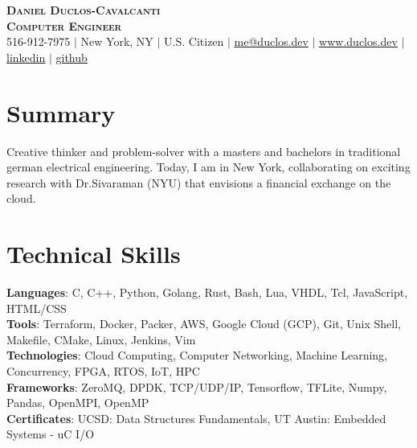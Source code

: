 \documentclass[letterpaper,11pt]{article}
\begin{document}
\begin{flushright}
\end{flushright}

\vspace{-5pt}

\begin{center}
    \textbf{\Huge \scshape Daniel Duclos-Cavalcanti} \\ \vspace{1pt}
    \textbf{\large{\scshape Computer Engineer}} \\ \vspace{1pt}
    \small 516-912-7975 $|$ New York, NY $|$ U.S. Citizen $|$
    \href{mailto:me@duclos.dev}{\underline{me@duclos.dev}} $|$ 
    \href{https://www.duclos.dev}{\underline{www.duclos.dev}} $|$
    \href{https://www.linkedin.com/in/duclos-cavalcanti/}{\underline{linkedin}} $|$
    \href{https://github.com/duclos-cavalcanti}{\underline{github}}
\end{center}

\section{Summary}
\small{
Creative thinker and problem-solver with a masters and bachelors in 
traditional german electrical engineering. Today, I am in New York, 
collaborating on exciting research with Dr.Sivaraman (NYU) that 
envisions a financial exchange on the cloud.
}

\vspace{-8.0pt}

\section{Technical Skills}
 \begin{itemize}[leftmargin=0.15in, label={}]
    \small{\item{
    \textbf{Languages}{: C, C++, Python, Golang, Rust, Bash, Lua, VHDL, Tcl, JavaScript, HTML/CSS} \\
    \textbf{Tools}{: Terraform, Docker, Packer, AWS, Google Cloud (GCP), Git, Unix Shell, Makefile, CMake, Linux, Jenkins, Vim} \\
    \textbf{Technologies}{: Cloud Computing, Computer Networking, Machine Learning, Concurrency, FPGA, RTOS, IoT, HPC} \\
    \textbf{Frameworks}{: ZeroMQ, DPDK, TCP/UDP/IP, Tensorflow, TFLite, Numpy, Pandas, OpenMPI, OpenMP} \\
    \textbf{Certificates}{: UCSD: Data Structures Fundamentals, UT Austin: Embedded Systems - uC I/O} \\
    }}
 \end{itemize}
\end{document}
